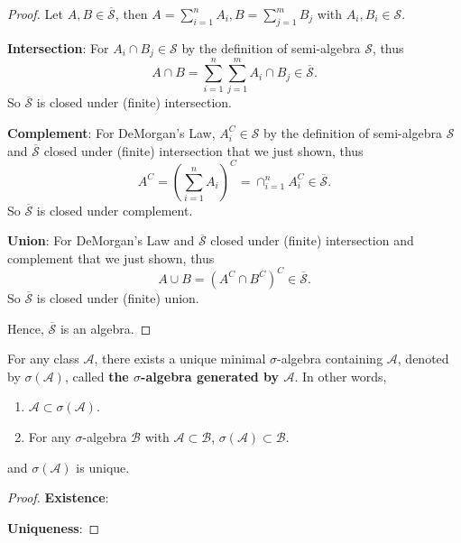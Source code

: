 \begin{proof}
	Let \(A,B\in\overline{\mathcal{S}}\), then \(A=\sum_{i=1}^{n}A_i, B=\sum_{j=1}^{m}B_j\) with \(A_i,B_i\in\mathcal{S}\).

	\textbf{Intersection}: For \(A_i\cap B_j\in\mathcal{S}\) by the definition of semi-algebra \(\mathcal{S}\), thus
	\begin{equation*}
		A\cap B=\sum_{i=1}^{n}\sum_{j=1}^{m}A_i\cap B_j\in\overline{\mathcal{S}}.
	\end{equation*}
	So \(\overline{\mathcal{S}}\) is closed under (finite) intersection.

	\textbf{Complement}: For DeMorgan's Law, \(A_i^C\in\mathcal{S}\) by the definition of semi-algebra \(\mathcal{S}\) and \(\overline{\mathcal{S}}\) closed under (finite) intersection that we just shown, thus
	\begin{equation*}
		A^C=(\sum_{i=1}^{n}A_i)^C=\cap_{i=1}^{n}A_i^C\in\overline{\mathcal{S}}.
	\end{equation*}
	So \(\overline{\mathcal{S}}\) is closed under complement.

	\textbf{Union}: For DeMorgan's Law and \(\overline{\mathcal{S}}\) closed under (finite) intersection and complement that we just shown, thus
	\begin{equation*}
		A\cup B=(A^C\cap B^C)^C\in\overline{\mathcal{S}}.
	\end{equation*}
	So \(\overline{\mathcal{S}}\) is closed under (finite) union.

	Hence, \(\overline{\mathcal{S}}\) is an algebra.
\end{proof}

\begin{theorem}
	For any class \(\mathcal{A}\), there exists a unique minimal \(\sigma\)-algebra containing \(\mathcal{A}\), denoted by \(\sigma(\mathcal{A})\), called \textbf{the \(\sigma\)-algebra generated by \(\mathcal{A}\)}. In other words,
	\begin{enumerate}
		\item \(\mathcal{A}\subset\sigma(\mathcal{A})\).
		\item For any \(\sigma\)-algebra \(\mathcal{B}\) with \(\mathcal{A}\subset\mathcal{B}\), \(\sigma(\mathcal{A})\subset\mathcal{B}\).
	\end{enumerate}
	and \(\sigma(\mathcal{A})\) is unique.
\end{theorem}

\begin{proof}
	\textbf{Existence}:\par
	\textbf{Uniqueness}:\par
\end{proof}

